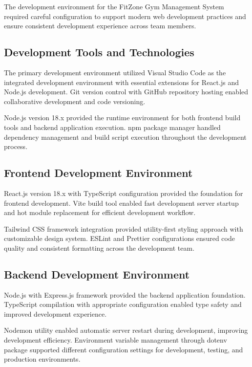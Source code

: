 \documentclass[12pt,a4paper]{report}
\begin{document}
The development environment for the FitZone Gym Management System required careful configuration to support modern web development practices and ensure consistent development experience across team members.

\subsection{Development Tools and Technologies}

The primary development environment utilized Visual Studio Code as the integrated development environment with essential extensions for React.js and Node.js development. Git version control with GitHub repository hosting enabled collaborative development and code versioning.

Node.js version 18.x provided the runtime environment for both frontend build tools and backend application execution. npm package manager handled dependency management and build script execution throughout the development process.

\subsection{Frontend Development Environment}

React.js version 18.x with TypeScript configuration provided the foundation for frontend development. Vite build tool enabled fast development server startup and hot module replacement for efficient development workflow.

Tailwind CSS framework integration provided utility-first styling approach with customizable design system. ESLint and Prettier configurations ensured code quality and consistent formatting across the development team.

\subsection{Backend Development Environment}

Node.js with Express.js framework provided the backend application foundation. TypeScript compilation with appropriate configuration enabled type safety and improved development experience.

Nodemon utility enabled automatic server restart during development, improving development efficiency. Environment variable management through dotenv package supported different configuration settings for development, testing, and production environments.
\end{document}
